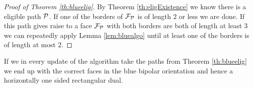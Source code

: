 \begin{proof}[Proof of Theorem \ref{th:blueelig}]
By Theorem \ref{th:eligExistence} we know there is a eligible path $\P$. If one of the borders of $\F_\P$ is of length $2$ or less we are done. If this path gives raise to a face $\F_\P$ with both borders are both of length at least $3$ we can repeatedly apply Lemma \ref{lem:bluealgo} until at least one of the borders is of length at most $2$.
\end{proof}

If we in every update of the algorithm take the paths from Theorem  \ref{th:blueelig} we end up with the correct faces in the blue bipolar orientation and hence a horizontally one sided rectangular dual.
